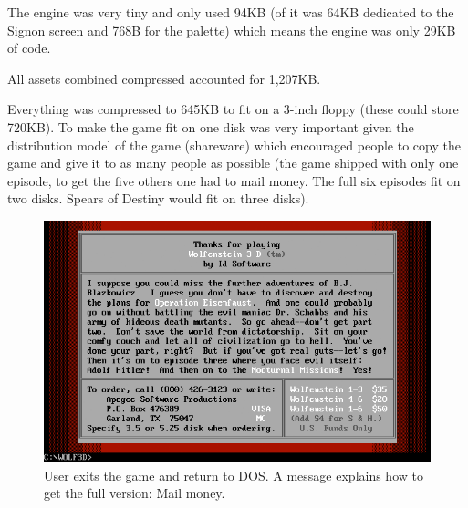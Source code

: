 \documentclass[book.tex]{subfiles}
\begin{document}
\par
 The engine was very tiny and only used 94KB (of it was 64KB dedicated to the Signon screen and 768B for the palette) which means the engine was only 29KB of code.\\
 \par
 All assets combined compressed accounted for 1,207KB.\\
 \par
 Everything was compressed to 645KB to fit on a 3-inch floppy (these could store 720KB). To make the game fit on one disk was very important given the distribution model
 of the game (shareware) which encouraged people to copy the game and give it to as many people as possible (the game shipped with only one episode, to get the five others
 one had to mail money. The full six episodes fit on two disks. Spears of Destiny would fit on three disks).
\begin{figure}[H]
\centering
 \includegraphics[width=\textwidth]{imgs/shareware.png}
 \caption{User exits the game and return to DOS. A message explains how to get the full version: Mail money.}
 \end{figure}
\end{document}

